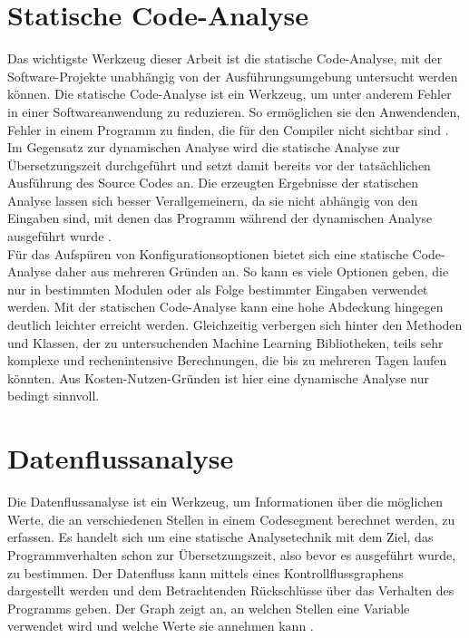 \documentclass[german,bachelor]{swsLeipzig}
\begin{document}
\section{Statische Code-Analyse}
Das wichtigste Werkzeug dieser Arbeit ist die statische Code-Analyse,
mit der Software-Projekte unabhängig von der Ausführungsumgebung untersucht werden können.
Die statische Code-Analyse ist ein Werkzeug, um unter anderem Fehler in einer Softwareanwendung zu reduzieren.
So ermöglichen sie den Anwendenden, Fehler in einem Programm zu finden, die für den Compiler nicht sichtbar sind \cite[]{bardas2010static}.\\
\indent Im Gegensatz zur dynamischen Analyse wird die statische Analyse zur Übersetzungszeit durchgeführt
und setzt damit bereits vor der tatsächlichen Ausführung des Source Codes an.
Die erzeugten Ergebnisse der statischen Analyse lassen sich besser Verallgemeinern, da sie nicht abhängig von den Eingaben sind,
mit denen das Programm während der dynamischen Analyse ausgeführt wurde \cite[]{gomes2009overview}.\\
\indent Für das Aufspüren von Konfigurationsoptionen bietet sich eine statische Code-Analyse daher aus mehreren Gründen an.
So kann es viele Optionen geben, die nur in bestimmten Modulen oder als Folge bestimmter Eingaben verwendet werden.
Mit der statischen Code-Analyse kann eine hohe Abdeckung hingegen deutlich leichter erreicht werden.
Gleichzeitig verbergen sich hinter den Methoden und Klassen, der zu untersuchenden Machine Learning Bibliotheken,
teils sehr komplexe und rechenintensive Berechnungen, die bis zu mehreren Tagen laufen könnten.
Aus Kosten-Nutzen-Gründen ist hier eine dynamische Analyse nur bedingt sinnvoll.\\

\section{Datenflussanalyse}
Die Datenflussanalyse ist ein Werkzeug, um Informationen über die möglichen Werte, die an verschiedenen
Stellen in einem Codesegment berechnet werden, zu erfassen.
Es handelt sich um eine statische Analysetechnik mit dem Ziel, das Programmverhalten schon zur Übersetzungszeit,
also bevor es ausgeführt wurde, zu bestimmen.
Der Datenfluss kann mittels eines Kontrollflussgraphens dargestellt werden und dem Betrachtenden
Rückschlüsse über das Verhalten des Programms geben.
Der Graph zeigt an, an welchen Stellen eine Variable verwendet wird und welche Werte sie annehmen kann \cite[]{58766}.\\
\end{document}
